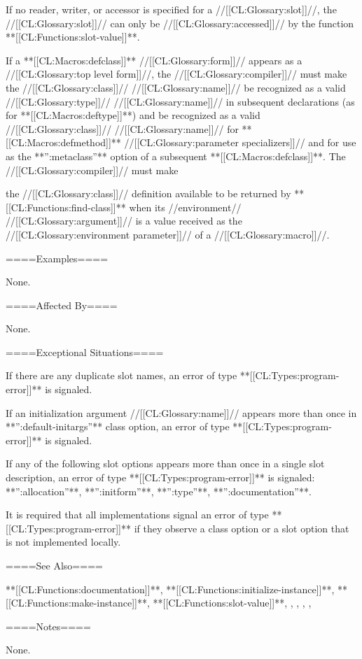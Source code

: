If no reader, writer, or accessor is specified for a //[[CL:Glossary:slot]]//, the //[[CL:Glossary:slot]]// can only be //[[CL:Glossary:accessed]]// by the function **[[CL:Functions:slot-value]]**.














If a **[[CL:Macros:defclass]]** //[[CL:Glossary:form]]// appears as a //[[CL:Glossary:top level form]]//, the //[[CL:Glossary:compiler]]// must make the //[[CL:Glossary:class]]// //[[CL:Glossary:name]]// be recognized as a valid //[[CL:Glossary:type]]// //[[CL:Glossary:name]]// in subsequent declarations (as for **[[CL:Macros:deftype]]**) and be recognized as a valid //[[CL:Glossary:class]]// //[[CL:Glossary:name]]// for **[[CL:Macros:defmethod]]** //[[CL:Glossary:parameter specializers]]// and for use as the **'':metaclass''** option of a subsequent **[[CL:Macros:defclass]]**. The //[[CL:Glossary:compiler]]// must make

the //[[CL:Glossary:class]]// definition available to be returned by **[[CL:Functions:find-class]]** when its //environment// //[[CL:Glossary:argument]]// is a value received as the //[[CL:Glossary:environment parameter]]// of a //[[CL:Glossary:macro]]//.

====Examples====

None.

====Affected By====

None.

====Exceptional Situations====

If there are any duplicate slot names, an error of type **[[CL:Types:program-error]]** is signaled.

If an initialization argument //[[CL:Glossary:name]]// appears more than once in **'':default-initargs''** class option, an error of type **[[CL:Types:program-error]]** is signaled.

If any of the following slot options appears more than once in a single slot description, an error of type **[[CL:Types:program-error]]** is signaled: **'':allocation''**, **'':initform''**, **'':type''**, **'':documentation''**.

It is required that all implementations signal an error of type **[[CL:Types:program-error]]** if they observe a class option or a slot option that is not implemented locally.



====See Also====

**[[CL:Functions:documentation]]**, **[[CL:Functions:initialize-instance]]**, **[[CL:Functions:make-instance]]**, **[[CL:Functions:slot-value]]**, {\secref\Classes}, {\secref\Inheritance}, {\secref\ClassReDef}, {\secref\DeterminingtheCPL}, {\secref\ObjectCreationAndInit}

====Notes====

None.

 
